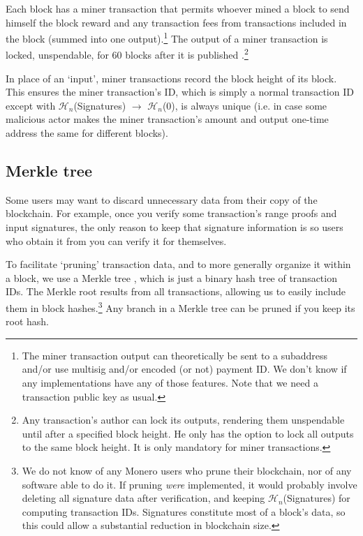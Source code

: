 Each block has a miner transaction that permits whoever mined a block to send himself the block reward and any transaction fees from transactions included in the block (summed into one output).\footnote{The miner transaction output can theoretically be sent to a subaddress and/or use multisig and/or encoded (or not) payment ID. We don't know if any implementations have any of those features. Note that we need a transaction public key as usual.} The output of a miner transaction is locked, unspendable, for 60 blocks after it is published \cite{transaction-lock}.\footnote{Any transaction's author can lock its outputs, rendering them unspendable until after a specified block height. He only has the option to lock all outputs to the same block height. It is only mandatory for miner transactions.}%

In place of an `input', miner transactions record the block height of its block. This ensures the miner transaction's ID, which is simply a normal transaction ID except with $\mathcal{H}_n$(Signatures) $\rightarrow$ $\mathcal{H}_n$(0), is always unique (i.e. in case some malicious actor makes the miner transaction's amount and output one-time address the same for different blocks).


\subsection{Merkle tree}
\label{subsec:merkle-tree} %

Some users may want to discard unnecessary data from their copy of the blockchain. For example, once you verify some transaction's range proofs and input signatures, the only reason to keep that signature information is so users who obtain it from you can verify it for themselves.

To facilitate `pruning' transaction data, and to more generally organize it within a block, we use a Merkle tree \cite{merkle-tree}, which is just a binary hash tree of transaction IDs. The Merkle root results from all transactions, allowing us to easily include them in block hashes.\footnote{We do not know of any Monero users who prune their blockchain, nor of any software able to do it. If pruning {\em were} implemented, it would probably involve deleting all signature data after verification, and keeping $\mathcal{H}_n$(Signatures) for computing transaction IDs. Signatures constitute most of a block's data, so this could allow a substantial reduction in blockchain size.} Any branch in a Merkle tree can be pruned if you keep its root hash.

